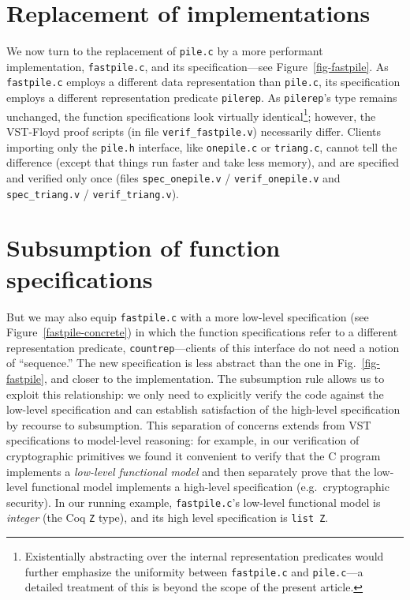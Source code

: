 \documentclass[runningheads,orivec]{llncs}
\begin{document}
\section{Replacement of implementations}
\label{sec:subsumption}
We now turn to the replacement of \lstinline{pile.c} by a more
performant implementation, \lstinline{fastpile.c}, and its
specification---see Figure~\ref{fig-fastpile}. As
\lstinline{fastpile.c} employs a different data representation than
\lstinline{pile.c}, its specification employs a different
representation predicate \lstinline{pilerep}. As \lstinline{pilerep}'s
type remains unchanged, the function specifications look virtually
identical\footnote{\label{footnote-existential}Existentially abstracting over the internal
  representation predicates would further emphasize the uniformity
  between \lstinline{fastpile.c} and \lstinline{pile.c}---a detailed
  treatment of this is beyond the scope of the present article.};
however, the VST-Floyd proof scripts (in file
\lstinline{verif_fastpile.v}) necessarily differ. Clients importing only
the \lstinline{pile.h} interface, like \lstinline{onepile.c} or
\lstinline{triang.c}, cannot tell the difference (except that things
run faster and take less memory), and are specified and verified only
once (files \lstinline{spec_onepile.v} / \lstinline{verif_onepile.v}
and \lstinline{spec_triang.v} / \lstinline{verif_triang.v}).



\section{Subsumption of function specifications}

But we may also equip \lstinline{fastpile.c} with a more low-level
specification (see Figure~\ref{fastpile-concrete}) in which the
function specifications refer to a different representation predicate,
\lstinline{countrep}---clients of this interface do not need a notion
of ``sequence.'' 
The new specification is less abstract than the one
in Fig.~\ref{fig-fastpile},
and closer to the implementation.  The subsumption rule
allows us to exploit this relationship: we only
need to explicitly verify the code against the low-level specification
and can establish satisfaction of the high-level specification by
recourse to subsumption. This separation of concerns extends
from VST specifications to model-level reasoning: for example, in our
verification of cryptographic primitives we found it convenient to
verify that the C program implements a \emph{low-level functional
  model} and then separately prove that the low-level functional model
implements a high-level specification (e.g.~cryptographic security).
In our running example, \lstinline{fastpile.c}'s low-level functional
model is \emph{integer} (the Coq \lstinline{Z} type), and its high
level specification is \lstinline{list Z}.
\end{document}
